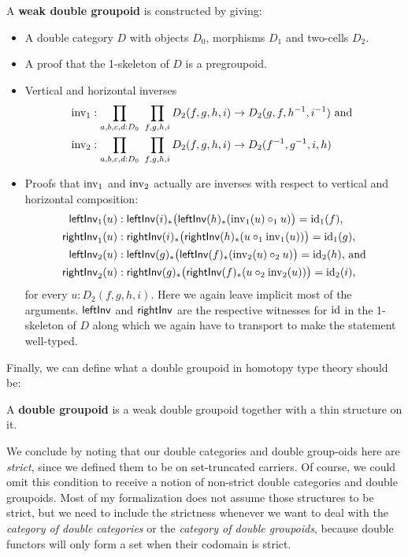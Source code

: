\begin{defn}
A \textbf{weak double groupoid} is constructed by giving:
\begin{itemize}
\item A double category $D$ with objects $D_0$, morphisms $D_1$ and two-cells $D_2$.
\item A proof that the 1-skeleton of $D$ is a pregroupoid.
\item Vertical and horizontal inverses
\begin{align*}
\operatorname{inv_1} &: \prod_{a,b,c,d:D_0} ~ \prod_{f,g,h,i}
	D_2(f,g,h,i) \to D_2(g,f,h^{-1},i^{-1}) \text{ and } \\
\operatorname{inv_2} &: \prod_{a,b,c,d:D_0} ~ \prod_{f,g,h,i}
	D_2(f,g,h,i) \to D_2(f^{-1},g^{-1},i,h)
\end{align*}
\item Proofs that $\operatorname{inv_1}$ and $\operatorname{inv_2}$ actually are inverses with respect to
vertical and horizontal composition:
\begin{align*}
\mathsf{leftInv}_1(u) &: \mathsf{leftInv}(i)_*\big(\mathsf{leftInv}(h)_*(\operatorname{inv_1}(u) \circ_1 u)\big) =
	\operatorname{id}_1(f) \text{,} \\
\mathsf{rightInv}_1(u) &: \mathsf{rightInv}(i)_*\big(\mathsf{rightInv}(h)_*(u \circ_1 \operatorname{inv_1}(u)) \big) =
	\operatorname{id}_1(g) \text{,} \\
\mathsf{leftInv}_2(u) &: \mathsf{leftInv}(g)_*\big(\mathsf{leftInv}(f)_*(\operatorname{inv_2}(u) \circ_2 u)\big) =
	\operatorname{id}_2(h) \text{, and} \\
\mathsf{rightInv}_2(u) &: \mathsf{rightInv}(g)_*\big(\mathsf{rightInv}(f)_*(u \circ_2 \operatorname{inv_2}(u)) \big) =
	\operatorname{id}_2(i) \text{,}
\end{align*}
for every $u : D_2(f,g,h,i)$.
Here we again leave implicit most of the arguments.
$\mathsf{leftInv}$ and $\mathsf{rightInv}$ are the respective witnesses for $\operatorname{id}$ in the 1-skeleton
of $D$ along which we again have to transport to make the statement well-typed.
\end{itemize}
\end{defn}

Finally, we can define what a double groupoid in homotopy type theory should be:

\begin{defn}
A \textbf{double groupoid} is a weak double groupoid together with a thin
structure on it.
\end{defn}

We conclude by noting that our double categories and double group-oids here are
\emph{strict}, since we defined them to be on set-truncated carriers.
Of course, we could omit this condition to receive a notion of non-strict double
categories and double groupoids.
Most of my formalization does not assume those structures to be strict, but we
need to include the strictness whenever we want to deal with the \emph{category
of double categories} or the \emph{category of double groupoids}, because double
functors will only form a set when their codomain is strict.

